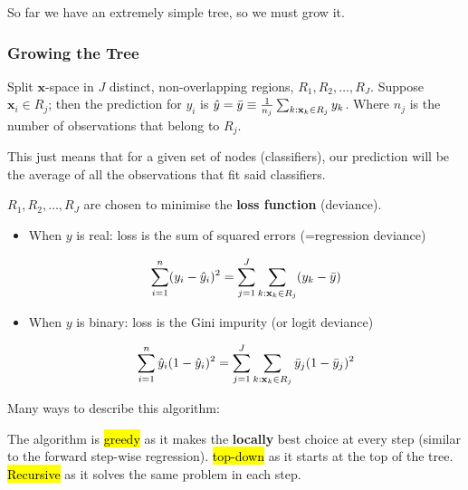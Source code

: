 \documentclass[11pt]{article}
\begin{document}
So far we have an extremely simple tree, so we must grow it.

\subsubsection{Growing the Tree}

\begin{definition}
    Split $\mathbf{x}$-space in $J$ distinct, non-overlapping regions, $R_1, R_2, \ldots, R_J$. Suppose $\mathbf{x}_i \in R_j$; then the prediction for $y_i$ is $\hat{y} = \Bar{y} \equiv \frac{1}{n_j}\sum_{k:\mathbf{x}_k\in R_j} y_k$. Where $n_j$ is the number of observations that belong to $R_j$.

    \begin{note}
        This just means that for a given set of nodes (classifiers), our prediction will be the average of all the observations that fit said classifiers.
    \end{note}

    $R_1, R_2, \ldots, R_J$ are chosen to minimise the \textbf{loss function} (deviance).

    \begin{itemize}
        \item When $y$ is real: loss is the sum of squared errors (=regression deviance)

        \begin{equation*}
            \sum_{i=1}^n(y_i - \hat{y}_i)^2 = \sum_{j=1}^J \sum_{k:\mathbf{x}_k\in R_j}(y_k - \Bar{y})
        \end{equation*}

        \item When $y$ is binary: loss is the Gini impurity (or logit deviance)

        \begin{equation*}
            \sum_{i=1}^n \hat{y}_i(1-\hat{y}_i)^2 = \sum_{j=1}^J \sum_{k:\mathbf{x}_k\in R_j} \Bar{y}_j(1-\Bar{y}_j)^2
        \end{equation*}
    \end{itemize}
\end{definition}

Many ways to describe this algorithm:

The algorithm is \hl{greedy} as it makes the \textbf{locally} best choice at every step (similar to the forward step-wise regression). \hl{top-down} as it starts at the top of the tree. \hl{Recursive} as it solves the same problem in each step.
\end{document}
